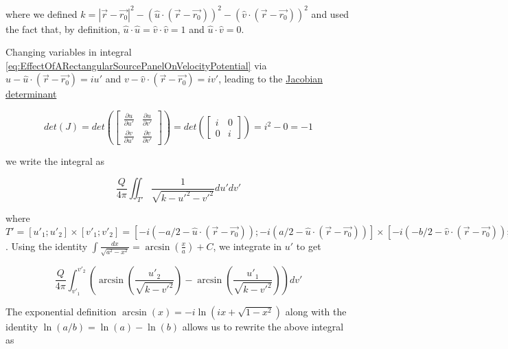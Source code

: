 ﻿\documentclass{article}
\begin{document}
where we defined $k = |\vec{r} - \vec{r_0}|^2 - (\hat{u} \cdot (\vec{r} - \vec{r_0}))^2 - (\hat{v} \cdot (\vec{r} - \vec{r_0}))^2$ and used the fact that, by definition, $\hat{u} \cdot \hat{u} = \hat{v} \cdot \hat{v} = 1$ and $\hat{u} \cdot \hat{v} = 0$.

Changing variables in integral \ref{eq:EffectOfARectangularSourcePanelOnVelocityPotential} via $u - \hat{u} \cdot (\vec{r} - \vec{r_0}) = i u'$ and $v - \hat{v} \cdot (\vec{r} - \vec{r_0}) = i v'$, leading to the \href{https://en.wikipedia.org/wiki/Jacobian_matrix_and_determinant}{Jacobian determinant}

\begin{equation*}
    det(J) = det 
    \left( 
    \begin{bmatrix}
    \frac{\partial u}{\partial u'} & \frac{\partial u}{\partial v'} \\
    \frac{\partial v}{\partial u'} & \frac{\partial v}{\partial v'}
    \end{bmatrix}
    \right)
    = det
    \left( 
    \begin{bmatrix}
    i & 0 \\
    0 & i
    \end{bmatrix}
    \right)
    = i^2 - 0 = -1
\end{equation*}

we write the integral as

\begin{equation*}
    \frac{Q}{4 \pi} \iint_{T'} \frac{1}{\sqrt{k - u'^2 - v'^2}} du' dv'
\end{equation*}

where $T' = [u'_1; u'_2] \times [v'_1; v'_2] = [-i (- a / 2 - \hat{u} \cdot (\vec{r} - \vec{r_0})); -i (a / 2 - \hat{u} \cdot (\vec{r} - \vec{r_0}))] \times [-i (- b / 2 - \hat{v} \cdot (\vec{r} - \vec{r_0})); -i (b / 2 - \hat{v} \cdot (\vec{r} - \vec{r_0}))]$. Using the identity $\int \frac{dx}{\sqrt{a^2 - x^2}} = \arcsin(\frac{x}{a}) + C$, we integrate in $u'$ to get

\begin{equation*}
    \frac{Q}{4 \pi} \int_{v'_1}^{v'_2} \left( \arcsin \left( \frac{u'_2}{\sqrt{k - v'^2}} \right) - \arcsin \left( \frac{u'_1}{\sqrt{k - v'^2}} \right) \right) dv'
\end{equation*}

The exponential definition $\arcsin(x) = -i \ln(ix + \sqrt{1 - x^2})$ along with the identity $\ln(a / b) = \ln(a) - \ln(b)$ allows us to rewrite the above integral as
\end{document}
